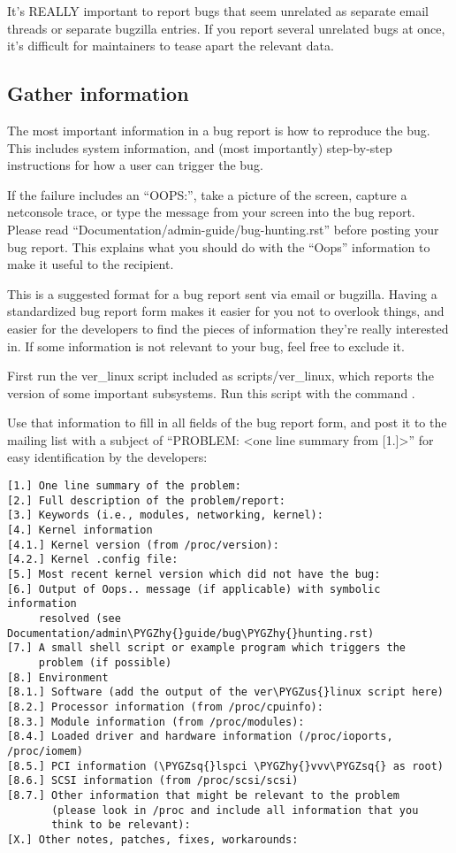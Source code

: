 \documentclass[a4paper,8pt,english]{sphinxmanual}
\def\PYGZus{\char`\_}
\def\PYGZhy{\char`\-}
\def\PYGZsq{\char`\'}
\renewcommand\PYGZsq{\textquotesingle}
\begin{document}
It's REALLY important to report bugs that seem unrelated as separate email
threads or separate bugzilla entries.  If you report several unrelated
bugs at once, it's difficult for maintainers to tease apart the relevant
data.


\subsection{Gather information}
\label{admin-guide/reporting-bugs:gather-information}
The most important information in a bug report is how to reproduce the
bug.  This includes system information, and (most importantly)
step-by-step instructions for how a user can trigger the bug.

If the failure includes an ``OOPS:'', take a picture of the screen, capture
a netconsole trace, or type the message from your screen into the bug
report.  Please read ``Documentation/admin-guide/bug-hunting.rst'' before posting your
bug report. This explains what you should do with the ``Oops'' information
to make it useful to the recipient.

This is a suggested format for a bug report sent via email or bugzilla.
Having a standardized bug report form makes it easier for you not to
overlook things, and easier for the developers to find the pieces of
information they're really interested in.  If some information is not
relevant to your bug, feel free to exclude it.

First run the ver\_linux script included as scripts/ver\_linux, which
reports the version of some important subsystems.  Run this script with
the command .

Use that information to fill in all fields of the bug report form, and
post it to the mailing list with a subject of ``PROBLEM: \textless{}one line
summary from {[}1.{]}\textgreater{}'' for easy identification by the developers:

\begin{Verbatim}[commandchars=\\\{\}]
[1.] One line summary of the problem:
[2.] Full description of the problem/report:
[3.] Keywords (i.e., modules, networking, kernel):
[4.] Kernel information
[4.1.] Kernel version (from /proc/version):
[4.2.] Kernel .config file:
[5.] Most recent kernel version which did not have the bug:
[6.] Output of Oops.. message (if applicable) with symbolic information
     resolved (see Documentation/admin\PYGZhy{}guide/bug\PYGZhy{}hunting.rst)
[7.] A small shell script or example program which triggers the
     problem (if possible)
[8.] Environment
[8.1.] Software (add the output of the ver\PYGZus{}linux script here)
[8.2.] Processor information (from /proc/cpuinfo):
[8.3.] Module information (from /proc/modules):
[8.4.] Loaded driver and hardware information (/proc/ioports, /proc/iomem)
[8.5.] PCI information (\PYGZsq{}lspci \PYGZhy{}vvv\PYGZsq{} as root)
[8.6.] SCSI information (from /proc/scsi/scsi)
[8.7.] Other information that might be relevant to the problem
       (please look in /proc and include all information that you
       think to be relevant):
[X.] Other notes, patches, fixes, workarounds:
\end{Verbatim}
\end{document}
